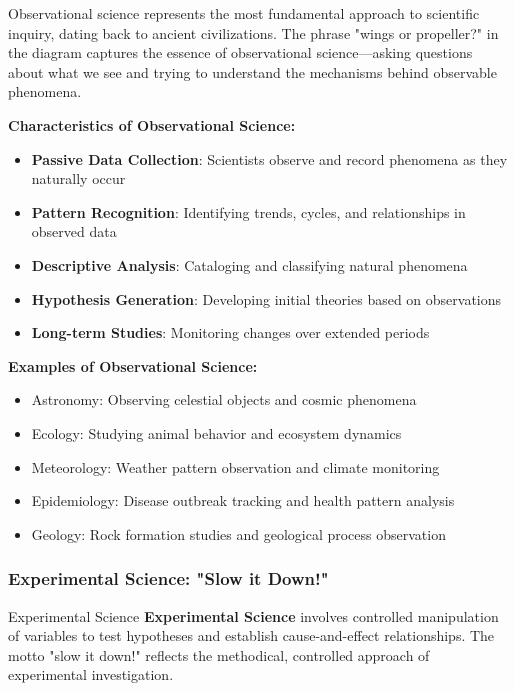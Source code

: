 Observational science represents the most fundamental approach to scientific inquiry, dating back to ancient civilizations. The phrase "wings or propeller?" in the diagram captures the essence of observational science—asking questions about what we see and trying to understand the mechanisms behind observable phenomena.

\textbf{Characteristics of Observational Science:}
\begin{itemize}
    \item \textbf{Passive Data Collection}: Scientists observe and record phenomena as they naturally occur
    \item \textbf{Pattern Recognition}: Identifying trends, cycles, and relationships in observed data
    \item \textbf{Descriptive Analysis}: Cataloging and classifying natural phenomena
    \item \textbf{Hypothesis Generation}: Developing initial theories based on observations
    \item \textbf{Long-term Studies}: Monitoring changes over extended periods
\end{itemize}

\textbf{Examples of Observational Science:}
\begin{itemize}
    \item Astronomy: Observing celestial objects and cosmic phenomena
    \item Ecology: Studying animal behavior and ecosystem dynamics
    \item Meteorology: Weather pattern observation and climate monitoring
    \item Epidemiology: Disease outbreak tracking and health pattern analysis
    \item Geology: Rock formation studies and geological process observation
\end{itemize}

\subsubsection{Experimental Science: "Slow it Down!"}

\begin{conceptcard}{Experimental Science}
\textbf{Experimental Science} involves controlled manipulation of variables to test hypotheses and establish cause-and-effect relationships. The motto "slow it down!" reflects the methodical, controlled approach of experimental investigation.
\end{conceptcard}


